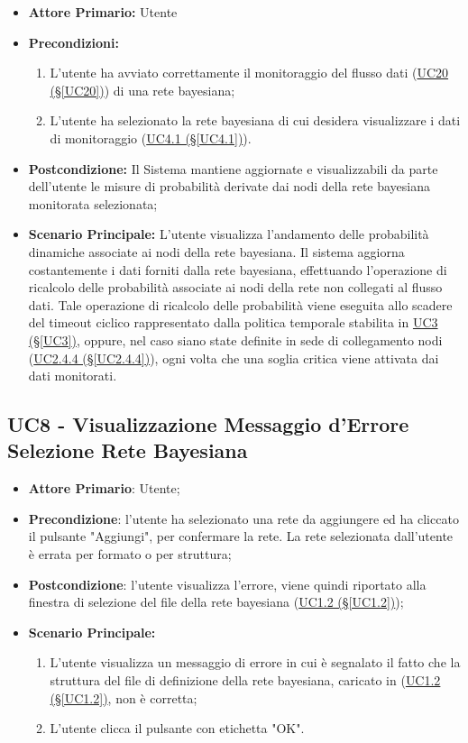 \begin{itemize}
	\item \textbf{Attore Primario:} Utente
	\item \textbf{Precondizioni:}
	\begin{enumerate}
 		\item L'utente ha avviato correttamente il monitoraggio del flusso dati (\hyperref[UC20]{UC20 (§\ref*{UC20})}) di una rete bayesiana;
 		\item L'utente ha selezionato la rete bayesiana di cui desidera visualizzare i dati di monitoraggio (\hyperref[UC4.1]{UC4.1 (§\ref*{UC4.1})}).
	\end{enumerate}
	\item \textbf{Postcondizione:} Il Sistema mantiene aggiornate e visualizzabili da parte dell'utente le misure di probabilità derivate dai nodi della rete bayesiana monitorata selezionata;
	\item \textbf{Scenario Principale:} L'utente visualizza l'andamento delle probabilità dinamiche associate ai nodi della rete bayesiana. Il sistema aggiorna costantemente i dati forniti dalla rete bayesiana, effettuando l'operazione di ricalcolo delle probabilità associate ai nodi della rete non collegati al flusso dati. Tale operazione di ricalcolo delle probabilità viene eseguita allo scadere del timeout ciclico rappresentato dalla politica temporale stabilita in \hyperref[UC3]{UC3 (§\ref*{UC3})}, oppure, nel caso siano state definite in sede di collegamento nodi (\hyperref[UC2.4.4]{UC2.4.4 (§\ref*{UC2.4.4})}), ogni volta che una soglia critica viene attivata dai dati monitorati.
\end{itemize}

\pagebreak

\subsection{UC8 - Visualizzazione Messaggio d'Errore Selezione Rete Bayesiana}\label{UC8}
\begin{itemize}
\item \textbf{Attore Primario}: Utente;
\item \textbf{Precondizione}: l'utente ha selezionato una rete da aggiungere ed ha cliccato il pulsante "Aggiungi", per confermare la rete. La rete selezionata dall'utente è errata per formato o per struttura;
\item \textbf{Postcondizione}: l'utente visualizza l'errore, viene quindi riportato alla finestra di selezione del file della rete bayesiana (\hyperref[UC1.2]{UC1.2 (§\ref*{UC1.2})});
\item \textbf{Scenario Principale:}
	\begin{enumerate}
	\item L'utente visualizza un messaggio di errore in cui è segnalato il fatto che la struttura del file di definizione della rete bayesiana, caricato in (\hyperref[UC1.2]{UC1.2 (§\ref*{UC1.2})}, non è corretta;
	\item L'utente clicca il pulsante con etichetta "OK".
	\end{enumerate}
\end{itemize}

